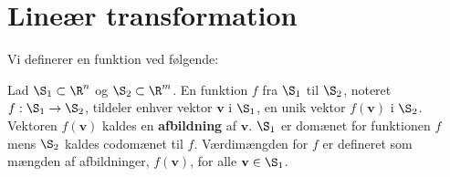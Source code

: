 \section{Lineær transformation}
Vi definerer en funktion ved følgende:
\begin{defn}{}{}
Lad $\S _1 \subset \R^n$ og $\S _2 \subset \R^m$.
En funktion $f$ fra $\S_1$ til $\S_2$, noteret $f:\S_1\rightarrow\S_2$, tildeler enhver vektor $\textbf{v}$ i $\S_1$, en unik vektor $f(\textbf{v})$ i $\S_2$.
Vektoren $f(\textbf{v})$ kaldes en \textbf{afbildning} af $\textbf{v}$.
$\S_1$ er domænet for funktionen $f$ mens $\S_2$ kaldes codomænet til $f$.
Værdimængden for $f$ er defineret som mængden af afbildninger, $f(\textbf{v})$, for alle $\textbf{v}\in \S_1$.
\end{defn}